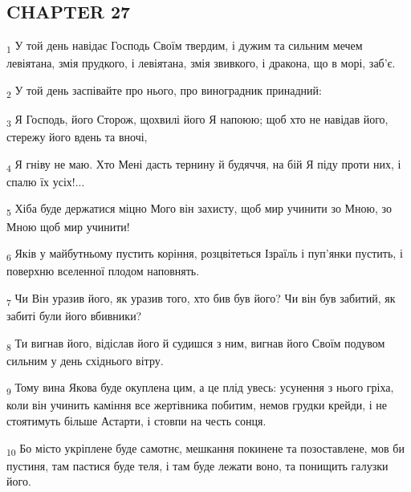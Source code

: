 \subsection{CHAPTER 27}
\begin{tcolorbox}
\textsubscript{1} У той день навідає Господь Своїм твердим, і дужим та сильним мечем левіятана, змія прудкого, і левіятана, змія звивкого, і дракона, що в морі, заб'є.
\end{tcolorbox}
\begin{tcolorbox}
\textsubscript{2} У той день заспівайте про нього, про виноградник принадний:
\end{tcolorbox}
\begin{tcolorbox}
\textsubscript{3} Я Господь, його Сторож, щохвилі його Я напоюю; щоб хто не навідав його, стережу його вдень та вночі,
\end{tcolorbox}
\begin{tcolorbox}
\textsubscript{4} Я гніву не маю. Хто Мені дасть тернину й будяччя, на бій Я піду проти них, і спалю їх усіх!...
\end{tcolorbox}
\begin{tcolorbox}
\textsubscript{5} Хіба буде держатися міцно Мого він захисту, щоб мир учинити зо Мною, зо Мною щоб мир учинити!
\end{tcolorbox}
\begin{tcolorbox}
\textsubscript{6} Яків у майбутньому пустить коріння, розцвітеться Ізраїль і пуп'янки пустить, і поверхню вселенної плодом наповнять.
\end{tcolorbox}
\begin{tcolorbox}
\textsubscript{7} Чи Він уразив його, як уразив того, хто бив був його? Чи він був забитий, як забиті були його вбивники?
\end{tcolorbox}
\begin{tcolorbox}
\textsubscript{8} Ти вигнав його, відіслав його й судишся з ним, вигнав його Своїм подувом сильним у день східнього вітру.
\end{tcolorbox}
\begin{tcolorbox}
\textsubscript{9} Тому вина Якова буде окуплена цим, а це плід увесь: усунення з нього гріха, коли він учинить каміння все жертівника побитим, немов грудки крейди, і не стоятимуть більше Астарти, і стовпи на честь сонця.
\end{tcolorbox}
\begin{tcolorbox}
\textsubscript{10} Бо місто укріплене буде самотнє, мешкання покинене та позоставлене, мов би пустиня, там пастися буде теля, і там буде лежати воно, та понищить галузки його.
\end{tcolorbox}

